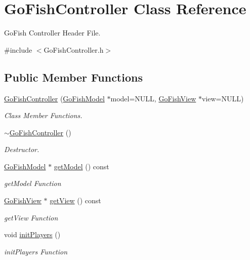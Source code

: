 \hypertarget{classGoFishController}{\section{Go\-Fish\-Controller Class Reference}
\label{classGoFishController}
}


Go\-Fish Controller Header File.  




{\ttfamily \#include $<$Go\-Fish\-Controller.\-h$>$}

\subsection*{Public Member Functions}
\begin{DoxyCompactItemize}
\item 
\hyperlink{classGoFishController_a867540948448fe1931740820960db311}{Go\-Fish\-Controller} (\hyperlink{classGoFishModel}{Go\-Fish\-Model} $\ast$model=N\-U\-L\-L, \hyperlink{classGoFishView}{Go\-Fish\-View} $\ast$view=N\-U\-L\-L)
\begin{DoxyCompactList}\small\item\em Class Member Functions. \end{DoxyCompactList}\item 
\hyperlink{classGoFishController_adaee893813ba46be8c700fb39cedf5da}{$\sim$\-Go\-Fish\-Controller} ()
\begin{DoxyCompactList}\small\item\em Destructor. \end{DoxyCompactList}\item 
\hyperlink{classGoFishModel}{Go\-Fish\-Model} $\ast$ \hyperlink{classGoFishController_a4a893d5469e332a67759aae1ba37b56f}{get\-Model} () const 
\begin{DoxyCompactList}\small\item\em get\-Model Function \end{DoxyCompactList}\item 
\hyperlink{classGoFishView}{Go\-Fish\-View} $\ast$ \hyperlink{classGoFishController_a851300407d70cbaba897f6a775ab41a6}{get\-View} () const 
\begin{DoxyCompactList}\small\item\em get\-View Function \end{DoxyCompactList}\item 
void \hyperlink{classGoFishController_af5f35b3ce1380d7e008030a2cfef5444}{init\-Players} ()
\begin{DoxyCompactList}\small\item\em init\-Players Function \end{DoxyCompactList}\item 

\end{DoxyCompactItemize}
